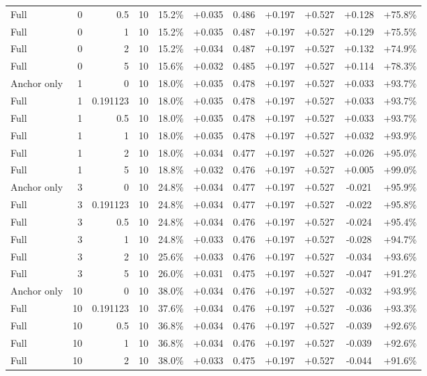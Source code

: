 \begin{table}[htbp]
\begin{tabular}{lrrrccccccc}
Full & 0 & 0.5 & 10 & 15.2\% & +0.035 & 0.486 & +0.197 & +0.527 & +0.128 & +75.8\% \\
Full & 0 & 1 & 10 & 15.2\% & +0.035 & 0.487 & +0.197 & +0.527 & +0.129 & +75.5\% \\
Full & 0 & 2 & 10 & 15.2\% & +0.034 & 0.487 & +0.197 & +0.527 & +0.132 & +74.9\% \\
Full & 0 & 5 & 10 & 15.6\% & +0.032 & 0.485 & +0.197 & +0.527 & +0.114 & +78.3\% \\
Anchor only & 1 & 0 & 10 & 18.0\% & +0.035 & 0.478 & +0.197 & +0.527 & +0.033 & +93.7\% \\
Full & 1 & 0.191123 & 10 & 18.0\% & +0.035 & 0.478 & +0.197 & +0.527 & +0.033 & +93.7\% \\
Full & 1 & 0.5 & 10 & 18.0\% & +0.035 & 0.478 & +0.197 & +0.527 & +0.033 & +93.7\% \\
Full & 1 & 1 & 10 & 18.0\% & +0.035 & 0.478 & +0.197 & +0.527 & +0.032 & +93.9\% \\
Full & 1 & 2 & 10 & 18.0\% & +0.034 & 0.477 & +0.197 & +0.527 & +0.026 & +95.0\% \\
Full & 1 & 5 & 10 & 18.8\% & +0.032 & 0.476 & +0.197 & +0.527 & +0.005 & +99.0\% \\
Anchor only & 3 & 0 & 10 & 24.8\% & +0.034 & 0.477 & +0.197 & +0.527 & -0.021 & +95.9\% \\
Full & 3 & 0.191123 & 10 & 24.8\% & +0.034 & 0.477 & +0.197 & +0.527 & -0.022 & +95.8\% \\
Full & 3 & 0.5 & 10 & 24.8\% & +0.034 & 0.476 & +0.197 & +0.527 & -0.024 & +95.4\% \\
Full & 3 & 1 & 10 & 24.8\% & +0.033 & 0.476 & +0.197 & +0.527 & -0.028 & +94.7\% \\
Full & 3 & 2 & 10 & 25.6\% & +0.033 & 0.476 & +0.197 & +0.527 & -0.034 & +93.6\% \\
Full & 3 & 5 & 10 & 26.0\% & +0.031 & 0.475 & +0.197 & +0.527 & -0.047 & +91.2\% \\
Anchor only & 10 & 0 & 10 & 38.0\% & +0.034 & 0.476 & +0.197 & +0.527 & -0.032 & +93.9\% \\
Full & 10 & 0.191123 & 10 & 37.6\% & +0.034 & 0.476 & +0.197 & +0.527 & -0.036 & +93.3\% \\
Full & 10 & 0.5 & 10 & 36.8\% & +0.034 & 0.476 & +0.197 & +0.527 & -0.039 & +92.6\% \\
Full & 10 & 1 & 10 & 36.8\% & +0.034 & 0.476 & +0.197 & +0.527 & -0.039 & +92.6\% \\
Full & 10 & 2 & 10 & 38.0\% & +0.033 & 0.475 & +0.197 & +0.527 & -0.044 & +91.6\% \\

\end{tabular}
\end{table}
